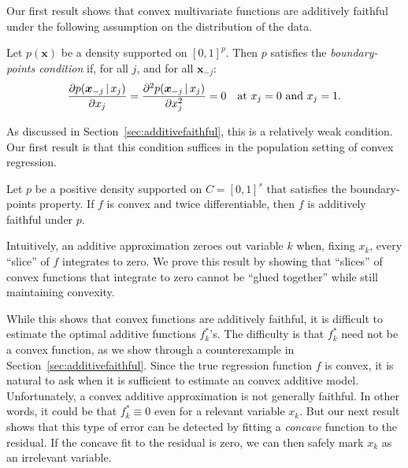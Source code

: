 Our first result shows that convex multivariate functions are
additively faithful
under the following assumption on the distribution of the data.
\begin{definition}
  Let $p(\mathbf{x})$ be a density supported on $[0,1]^p$.  Then $p$
  satisfies the \emph{boundary-points condition} if, for all $j$, and
  for all $\mathbf{x}_{-j}$:
\[
\frac{\partial p(\mbox{\boldmath $x$}_{-j} {\,|\,} x_j)}{\partial x_j}  =  
\frac{\partial^2 p(\mbox{\boldmath $x$}_{-j} {\,|\,} x_j)}{\partial x_j^2} = 0
\quad \textrm{at $x_j = 0$ and $x_j = 1$}.
\]
\end{definition}

As discussed in Section~\ref{sec:additivefaithful}, this is a relatively weak condition. 
Our first result is that this condition suffices in the population
setting of convex regression.

\begin{theorem}
  Let $p$ be a positive density supported on $C=[0,1]^s$ that
  satisfies the boundary-points property. If $f$ is convex and twice
  differentiable, then $f$ is additively faithful under $p$.
\end{theorem}


Intuitively, an additive approximation zeroes out variable $k$ when, fixing $x_k$, every
``slice'' of $f$ integrates to zero. We prove this result
by showing that ``slices'' of convex
functions that integrate to zero cannot be ``glued together'' while
still maintaining convexity.

While this shows that convex functions are additively faithful, it is difficult to
estimate the optimal additive functions $f^*_k$'s.  The difficulty
is that $f^*_k$ need not be
a convex function, as we show through a counterexample
in Section~\ref{sec:additivefaithful}.   
Since the true regression function $f$ is convex, it is natural to ask
when it is sufficient to estimate an convex additive model.  
Unfortunately, a convex additive approximation is not generally
faithful.  In other words, it could be that $f^*_k\equiv 0$
even for a relevant variable $x_k$.  But our next result
shows that this type of error can be detected by fitting 
a \textit{concave} function to the residual.  If the
concave fit to the residual is zero, we can then safely
mark $x_k$ as an irrelevant variable.

